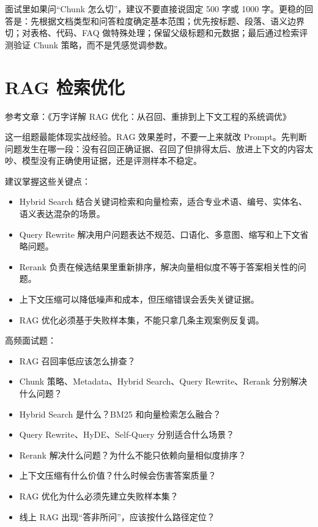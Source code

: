 \documentclass[10pt,a4paper]{ctexart}
\begin{document}
面试里如果问“Chunk 怎么切”，建议不要直接说固定 500 字或 1000 字。更稳的回答是：先根据文档类型和问答粒度确定基本范围；优先按标题、段落、语义边界切；对表格、代码、FAQ 做特殊处理；保留父级标题和元数据；最后通过检索评测验证 Chunk 策略，而不是凭感觉调参数。



\section{RAG 检索优化}


参考文章：《万字详解 RAG 优化：从召回、重排到上下文工程的系统调优》



这一组题最能体现实战经验。RAG 效果差时，不要一上来就改 Prompt。先判断问题发生在哪一段：没有召回正确证据、召回了但排得太后、放进上下文的内容太吵、模型没有正确使用证据，还是评测样本不稳定。



建议掌握这些关键点：


\begin{itemize}[itemsep=2pt, topsep=4pt]
  \item Hybrid Search 结合关键词检索和向量检索，适合专业术语、编号、实体名、语义表达混杂的场景。
  \item Query Rewrite 解决用户问题表达不规范、口语化、多意图、缩写和上下文省略问题。
  \item Rerank 负责在候选结果里重新排序，解决向量相似度不等于答案相关性的问题。
  \item 上下文压缩可以降低噪声和成本，但压缩错误会丢失关键证据。
  \item RAG 优化必须基于失败样本集，不能只拿几条主观案例反复调。
\end{itemize}


高频面试题：


\begin{itemize}[itemsep=2pt, topsep=4pt]
  \item RAG 召回率低应该怎么排查？
  \item Chunk 策略、Metadata、Hybrid Search、Query Rewrite、Rerank 分别解决什么问题？
  \item Hybrid Search 是什么？BM25 和向量检索怎么融合？
  \item Query Rewrite、HyDE、Self-Query 分别适合什么场景？
  \item Rerank 解决什么问题？为什么不能只依赖向量相似度排序？
  \item 上下文压缩有什么价值？什么时候会伤害答案质量？
  \item RAG 优化为什么必须先建立失败样本集？
  \item 线上 RAG 出现“答非所问”，应该按什么路径定位？
\end{itemize}
\end{document}
